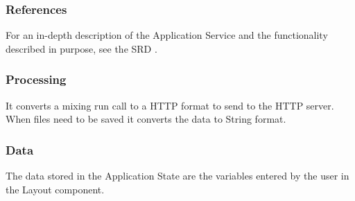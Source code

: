 \subsubsection*{References}
For an in-depth description of the Application Service and the functionality described in purpose, see the SRD \cite{srd}.

\subsubsection*{Processing}
It converts a mixing run call to a HTTP format to send to the HTTP server. When files need to be saved it converts the data to String format.

\subsubsection*{Data}
The data stored in the Application State are the variables entered by the user in the Layout component.

